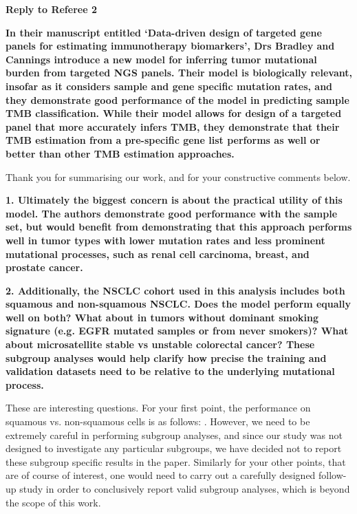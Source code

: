 \documentclass[12pt]{article}
\begin{document}
\clearpage

{\large \textbf{Reply to Referee 2}}

\textbf{In their manuscript entitled ‘Data-driven design of targeted gene panels for estimating immunotherapy biomarkers’, Drs Bradley and Cannings introduce a new model for inferring tumor mutational burden from targeted NGS panels. Their model is biologically relevant, insofar as it considers sample and gene specific mutation rates, and they demonstrate good performance of the model in predicting sample TMB classification. While their model allows for design of a targeted panel that more accurately infers TMB, they demonstrate that their TMB estimation from a pre-specific gene list performs as well or better than other TMB estimation approaches.}

Thank you for summarising our work, and for your constructive comments below. 

\textbf{1. Ultimately the biggest concern is about the practical utility of this model. The authors demonstrate good performance with the sample set, but would benefit from demonstrating that this approach performs well in tumor types with lower mutation rates and less prominent mutational processes, such as renal cell carcinoma, breast, and prostate cancer.}


\textbf{2. Additionally, the NSCLC cohort used in this analysis includes both squamous and non-squamous NSCLC. Does the model perform equally well on both? What about in tumors without dominant smoking signature (e.g. EGFR mutated samples or from never smokers)? What about microsatellite stable vs unstable colorectal cancer? These subgroup analyses would help clarify how precise the training and validation datasets need to be relative to the underlying mutational process. }


These are interesting questions.  For your first point, the performance on squamous vs. non-squamous cells is as follows: .  However, we need to be extremely careful in performing subgroup analyses, and since our study was not designed to investigate any particular subgroups, we have decided not to report these subgroup specific results in the paper.  Similarly for your other points, that are of course of interest, one would need to carry out a carefully designed follow-up study in order to conclusively report valid subgroup analyses, which is beyond the scope of this work.  
\end{document}
